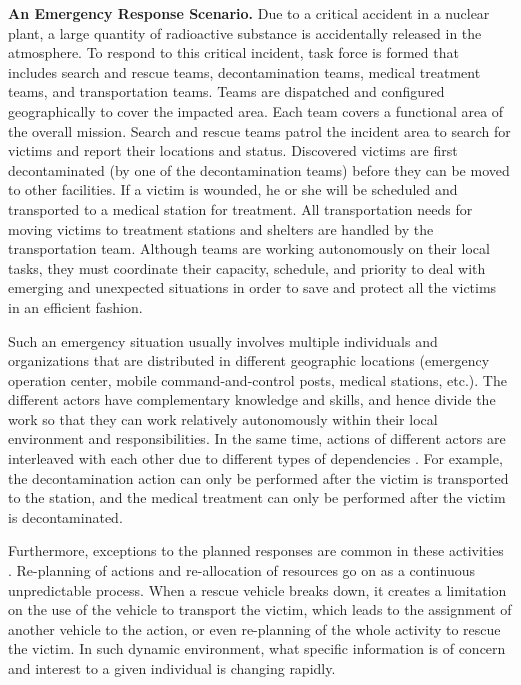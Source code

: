 \begin{scenario}
\textbf{An Emergency Response Scenario.} 
Due to a critical accident in a nuclear plant, a large quantity of radioactive substance is accidentally released in the atmosphere. To respond to this critical incident, task force is formed that includes search and rescue teams, decontamination teams, medical treatment teams, and transportation teams. Teams are dispatched and configured geographically to cover the impacted area. Each team covers a functional area of the overall mission.  Search and rescue teams patrol the incident area to search for victims and report their locations and status. Discovered victims are first decontaminated (by one of the decontamination teams) before they can be moved to other facilities.  If a victim is wounded, he or she will be scheduled and transported to a medical station for treatment. All transportation needs for moving victims to treatment stations and shelters are handled by the transportation team. Although teams are working autonomously on their local tasks, they must coordinate their capacity, schedule, and priority to deal with emerging and unexpected situations in order to save and protect all the victims in an efficient fashion.
\end{scenario}

Such an emergency situation usually involves multiple individuals and organizations that are distributed in different geographic locations (emergency operation center, mobile command-and-control posts, medical stations, etc.). The different actors have complementary knowledge and skills, and hence divide the work so that they can work relatively autonomously within their local environment and responsibilities. In the same time, actions of different actors are interleaved with each other due to different types of dependencies \cite{shen2004managing}. For example, the decontamination action can only be performed after the victim is transported to the station, and the medical treatment can only be performed after the victim is decontaminated.

Furthermore, exceptions to the planned responses are common in these activities \cite{Turoff2004}. Re-planning of actions and re-allocation of resources go on as a continuous unpredictable process. When a rescue vehicle breaks down, it creates a limitation on the use of the vehicle to transport the victim, which leads to the assignment of another vehicle to the action, or even re-planning of the whole activity to rescue the victim. In such dynamic environment, what specific information is of concern and interest to a given individual is changing rapidly.

